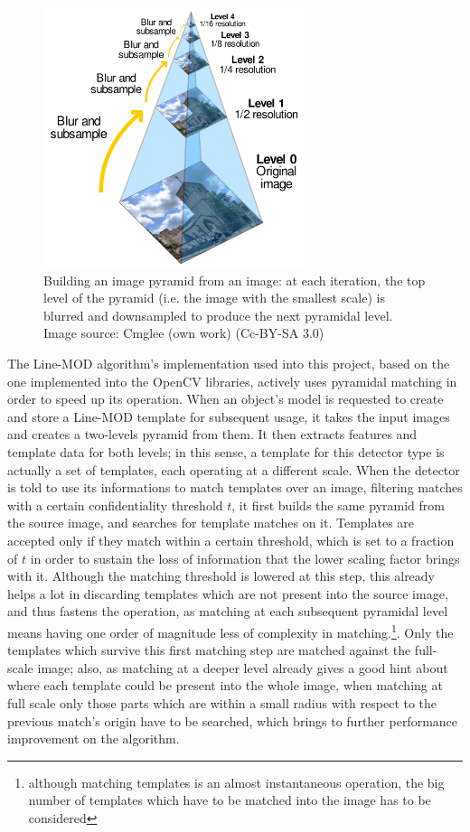 \begin{figure}[htbp]
\centering
\includegraphics[width=3in]{./Graphics/pyramidal-images}
\caption{Building an image pyramid from an image: at each iteration,
  the top level of the pyramid (i.e. the image with the smallest
  scale) is blurred and downsampled to produce the next pyramidal
  level. Image source: Cmglee (own work) (Cc-BY-SA 3.0)
  \label{fig:pyramidal-images}}
\end{figure}

The Line-MOD algorithm's implementation used into this project, based
on the one implemented into the OpenCV libraries, actively uses
pyramidal matching in order to speed up its operation. When an
object's model is requested to create and store a Line-MOD template
for subsequent usage, it takes the input images and creates a
two-levels pyramid from them. It then extracts features and template
data for both levels; in this sense, a template for this detector type
is actually a set of templates, each operating at a different
scale. When the detector is told to use its informations to
match templates over an image, filtering matches with a certain
confidentiality threshold $t$, it first builds the same pyramid from
the source image, and searches for template matches on it. Templates
are accepted only if they match within a certain threshold, which is
set to a fraction of $t$ in order to sustain the loss of information
that the lower scaling factor brings with it. Although the matching
threshold is lowered at this step, this already helps a lot in
discarding templates which are not present into the source image, and
thus fastens the operation, as matching at each subsequent pyramidal
level means having one order of magnitude less of complexity in
matching.\footnote{although matching templates is an almost
  instantaneous operation, the big number of templates which have to
  be matched into the image has to be considered}. Only the templates
which survive this first matching step are matched against the
full-scale image; also, as matching at a deeper level already gives a
good hint about where each template could be present into the whole
image, when matching at full scale only those parts which are within a
small radius with respect to the previous match's origin have to  be
searched, which brings to further performance improvement on the algorithm.

